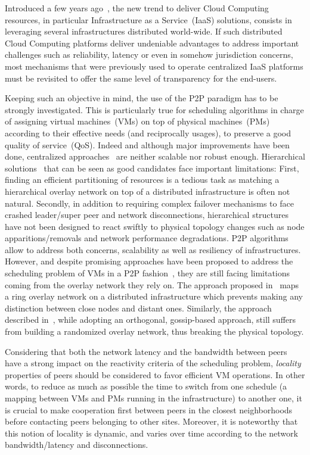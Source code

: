 Introduced a few years ago~\cite{greenberg:sigcomm09}, the new trend to deliver Cloud
Computing resources, in particular Infrastructure as a Service~(IaaS) solutions, consists
in leveraging several infrastructures distributed world-wide. If such distributed Cloud
Computing platforms deliver undeniable advantages to address important challenges such as
reliability, latency or even in somehow jurisdiction concerns, most mechanisms that were
previously used to operate centralized IaaS platforms must be revisited to offer the same
level of transparency for the end-users.

Keeping such an objective in mind, the use of the P2P paradigm has to be strongly
investigated. This is particularly true for scheduling algorithms in charge
of assigning virtual machines~(VMs) on top of physical machines~(PMs) according to their effective needs (and reciprocally
usages), to preserve a good quality of service~(QoS). Indeed and although 
major improvements have been done, centralized
approaches~\cite{hermenier:2013} are neither scalable nor robust enough. Hierarchical
solutions~\cite{feller:ccgrid12} that can be seen as good candidates face important
limitations: First, finding an efficient partitioning of resources is a tedious task as
matching a hierarchical overlay network on top of a distributed infrastructure is often not
natural. Secondly, in addition to requiring complex failover mechanisms to face
crashed leader/super peer and network disconnections, hierarchical structures have not
been designed to react swiftly to physical topology changes such as node
apparitions/removals and network performance degradations. P2P algorithms allow to
address both concerns, \ie scalability as well as resiliency of infrastructures. However,
and despite promising approaches have been proposed to address the scheduling problem of
VMs in a P2P fashion~\cite{quesnel:cpe2012,feller:cloudcom12}, they are still facing
limitations coming from the overlay network they rely on. The approach proposed
in~\cite{quesnel:cpe2012} maps a ring overlay network on a distributed infrastructure which
prevents making any distinction between close nodes and distant ones. Similarly, the
approach described in~\cite{feller:cloudcom12}, while adopting an orthogonal, gossip-based approach,
still suffers from building a randomized overlay network, thus breaking the physical topology.

Considering that both the network latency and the bandwidth between peers have a strong
impact on the reactivity criteria of the scheduling problem, \emph{locality} properties of
peers should be considered to favor efficient VM operations. In other words, to reduce as
much as possible the time to switch from one schedule (\ie a mapping between VMs and PMs
running in the infrastructure) to another one, it is crucial to make cooperation first
between peers in the closest neighborhoods before contacting peers belonging to other sites.
Moreover, it is noteworthy that this notion of locality is dynamic, and varies over time according
to the network bandwidth/latency and disconnections.

